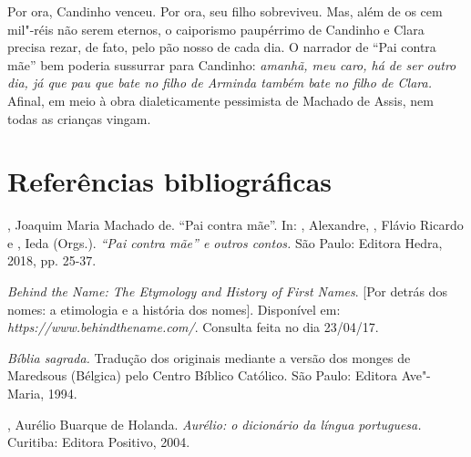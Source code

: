 Por ora, Candinho venceu. Por ora, seu filho sobreviveu. Mas, além de os
cem mil"-réis não serem eternos, o caiporismo paupérrimo de Candinho e
Clara precisa rezar, de fato, pelo pão nosso de cada dia. O narrador de
``Pai contra mãe'' bem poderia sussurrar para Candinho: \emph{amanhã,
meu caro, há de ser outro dia, já que pau que bate no filho de Arminda
também bate no filho de Clara.} Afinal, em meio à obra dialeticamente
pessimista de Machado de Assis, nem todas as crianças vingam.

\section{Referências bibliográficas}

, Joaquim Maria Machado de. ``Pai contra mãe''. In: ,
Alexandre, , Flávio Ricardo e , Ieda (Orgs.).
\emph{``Pai contra mãe'' e outros contos.} São Paulo: Editora Hedra,
2018, pp. 25-37.

\emph{Behind the Name: The Etymology and History of First Names}. [Por
detrás dos nomes: a etimologia e a história dos nomes]. Disponível em:
\emph{https://www.behindthename.com/}.
Consulta feita no dia 23/04/17.

\emph{Bíblia sagrada.} Tradução dos originais mediante a versão dos
monges de Maredsous (Bélgica) pelo Centro Bíblico Católico. São Paulo:
Editora Ave"-Maria, 1994.

, Aurélio Buarque de Holanda. \emph{Aurélio: o dicionário da
língua portuguesa.} Curitiba: Editora Positivo, 2004.